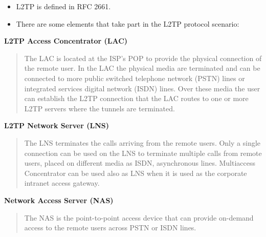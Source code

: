 \documentclass[10pt,a4paper]{article}
\begin{document}
\begin{itemize}
\begin{itemize}
\begin{itemize}
\item L2TP is defined in RFC 2661.
\item There are some elements that take part in the L2TP protocol scenario:
\end{itemize}

\textbf{L2TP Access Concentrator (LAC)}

\begin{quote}
The LAC is located at the ISP's POP to provide the physical connection of the
remote user. In the LAC the physical media are terminated and can be
connected to more public switched telephone network (PSTN) lines or
integrated services digital network (ISDN) lines. Over these media the user
can establish the L2TP connection that the LAC routes to one or more L2TP
servers where the tunnels are terminated.
\end{quote}


\textbf{L2TP Network Server (LNS)}

\begin{quote}
The LNS terminates the calls arriving from the remote users. Only a single
connection can be used on the LNS to terminate multiple calls from remote
users, placed on different media as ISDN, asynchronous lines. Multiaccess
Concentrator can be used also as LNS when it is used as the corporate
intranet access gateway.
\end{quote}

\textbf{Network Access Server (NAS)}
\begin{quote}
The NAS is the point-to-point access device that can provide on-demand
access to the remote users across PSTN or ISDN lines.
\end{quote}


\end{itemize}
\end{itemize}
\end{document}
